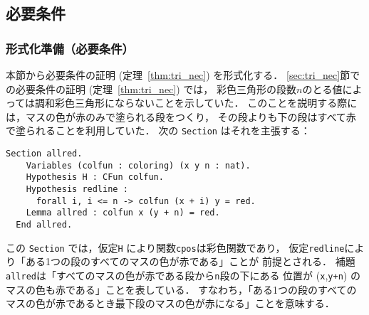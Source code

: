 

\subsection{必要条件}
\subsubsection{形式化準備（必要条件）}
本節から必要条件の証明 (定理~\ref{thm:tri_nec}) を形式化する．
\ref{sec:tri_nec}節での必要条件の証明 (定理~\ref{thm:tri_nec}) では，
彩色三角形の段数$n$のとる値によっては調和彩色三角形にならないことを示していた．
このことを説明する際には，マスの色が赤のみで塗られる段をつくり，
その段よりも下の段はすべて赤で塗られることを利用していた．
次の {\tt{Section}} はそれを主張する：
\begin{lstlisting}[language=Coq]
  Section allred.
    Variables (colfun : coloring) (x y n : nat).
    Hypothesis H : CFun colfun.
    Hypothesis redline :
      forall i, i <= n -> colfun (x + i) y = red.
    Lemma allred : colfun x (y + n) = red.
  End allred.
\end{lstlisting}  
この {\tt{Section}} では，仮定{\tt H} により関数{\tt cpos}は彩色関数であり，
仮定{\tt{redline}}により「ある1つの段のすべてのマスの色が赤である」ことが
前提とされる．
補題{\tt allred}は「すべてのマスの色が赤である段から{\tt{n}}段の下にある
位置が ({\tt{x}},{\tt{y+n}}) のマスの色も赤である」ことを表している．
すなわち，「ある1つの段のすべてのマスの色が赤であるとき最下段のマスの色が赤になる」ことを意味する．

